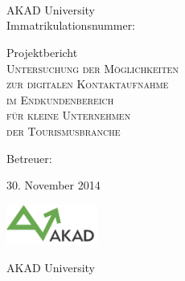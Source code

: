 

\begin{titlepage}


\vspace{5cm}

\Name \\ 
\Strasse \\ 
\PlzOrt\\ 
\href{mailto:\Email}{\Email}

AKAD University\\
Immatrikulationsnummer: \Immatrikulationsnummer

\vfill

Projektbericht\\
\LARGE
\textsc{Untersuchung der Möglichkeiten\\
zur digitalen Kontaktaufnahme\\
im Endkundenbereich\\
für kleine Unternehmen\\
der Tourismusbranche}

\vfill

\normalsize

Betreuer: \Betreuer

30. November 2014

\vfill

\includegraphics[width=3cm]{akad_logo.png}

AKAD University

\end{titlepage}



\normalsize
